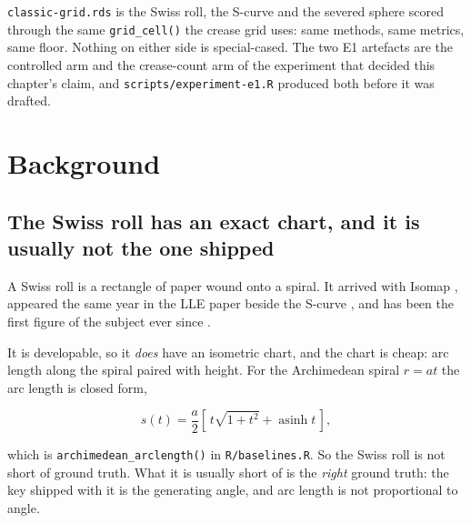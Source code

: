 \documentclass[
  british,
  a4paper,
]{book}
\begin{document}
\texttt{classic-grid.rds} is the Swiss roll, the S-curve and the severed sphere scored
through the same \texttt{grid\_cell()} the crease grid uses: same methods, same metrics,
same floor. Nothing on either side is special-cased. The two E1 artefacts are the
controlled arm and the crease-count arm of the experiment that decided this
chapter's claim, and \texttt{scripts/experiment-e1.R} produced both before it was
drafted.

\section{Background}\label{comp-background}

\subsection{The Swiss roll has an exact chart, and it is usually not the one shipped}\label{the-swiss-roll-has-an-exact-chart-and-it-is-usually-not-the-one-shipped}

A Swiss roll is a rectangle of paper wound onto a spiral. It arrived with Isomap
\citep{tenenbaum2000isomap}, appeared the same year in the LLE paper beside the
S-curve \citep{roweis2000lle}, and has been the first figure of the subject ever
since \citep{lee2007nonlinear}.

It is developable, so it \emph{does} have an isometric chart, and the chart is cheap:
arc length along the spiral paired with height. For the Archimedean spiral
\(r = at\) the arc length is closed form,

\[s(t) = \frac{a}{2}\left[\,t\sqrt{1+t^{2}} + \operatorname{asinh} t\,\right],\]

which is \texttt{archimedean\_arclength()} in \texttt{R/baselines.R}. So the Swiss roll is not
short of ground truth. What it is usually short of is the \emph{right} ground truth:
the key shipped with it is the generating angle, and arc length is not
proportional to angle.
\end{document}
